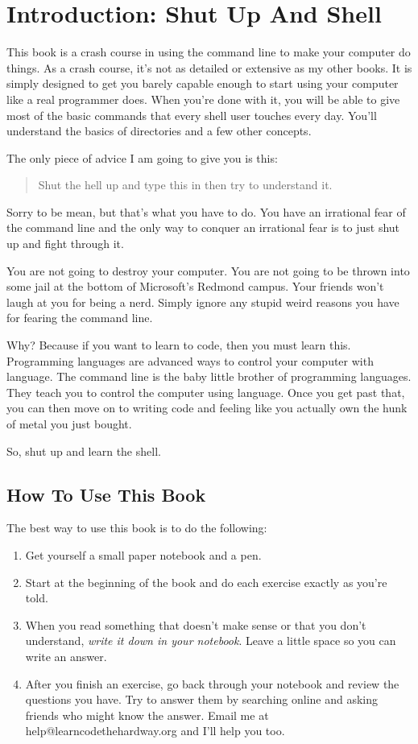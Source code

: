 \chapter*{Introduction: Shut Up And Shell}

This book is a crash course in using the command line to make your computer do things.
As a crash course, it's not as detailed or extensive as my other books.  It is simply
designed to get you barely capable enough to start using your computer like a real
programmer does.  When you're done with it, you will be able to give most of the
basic commands that every shell user touches every day.  You'll understand the basics
of directories and a few other concepts.

The only piece of advice I am going to give you is this:

\begin{quote}
Shut the hell up and type this in then try to understand it.
\end{quote}

Sorry to be mean, but that's what you have to do.  You have an irrational fear
of the command line and the only way to conquer an irrational fear is to just
shut up and fight through it.

You are not going to destroy your computer.  You are not going to be thrown
into some jail at the bottom of Microsoft's Redmond campus.  Your friends
won't laugh at you for being a nerd.  Simply ignore any stupid weird reasons you have
for fearing the command line.

Why?  Because if you want to learn to code, then you must learn this.  Programming
languages are advanced ways to control your computer with language.  The command line
is the baby little brother of programming languages.  They teach you to control the
computer using language.  Once you get past that, you can then move on to writing
code and feeling like you actually own the hunk of metal you just bought.

So, shut up and learn the shell.

\section{How To Use This Book}

The best way to use this book is to do the following:

\begin{enumerate}
\item Get yourself a small paper notebook and a pen.
\item Start at the beginning of the book and do each exercise exactly as you're told.
\item When you read something that doesn't make sense or that you don't understand, \emph{write it down in your notebook}.
    Leave a little space so you can write an answer.
\item After you finish an exercise, go back through your notebook and review the questions you have.  Try to answer them
    by searching online and asking friends who might know the answer.  Email me at help@learncodethehardway.org and I'll
    help you too.
\end{enumerate}

